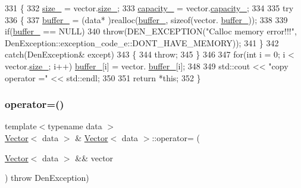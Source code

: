 \begin{DoxyCode}
331     \{
332         \hyperlink{classVector_a3c70fa478530a90177f2a7e7621ee688}{size\_} = vector.\hyperlink{classVector_a3c70fa478530a90177f2a7e7621ee688}{size\_};
333         \hyperlink{classVector_ad75911bb39018821f0e2911b6905b7ec}{capacity\_} = vector.\hyperlink{classVector_ad75911bb39018821f0e2911b6905b7ec}{capacity\_};
334 
335         \textcolor{keywordflow}{try}
336             \{
337                 \hyperlink{classVector_a22db58ae9e92c6014e8ac657804a035a}{buffer\_} = (data* )realloc(\hyperlink{classVector_a22db58ae9e92c6014e8ac657804a035a}{buffer\_}, \textcolor{keyword}{sizeof}(vector.
      \hyperlink{classVector_a22db58ae9e92c6014e8ac657804a035a}{buffer\_}));
338 
339                 \textcolor{keywordflow}{if}(\hyperlink{classVector_a22db58ae9e92c6014e8ac657804a035a}{buffer\_} == NULL)
340                     \textcolor{keywordflow}{throw}(DEN\_EXCEPTION(\textcolor{stringliteral}{"Calloc memory error!!!"}, 
      DenException::exception\_code\_e::DONT\_HAVE\_MEMORY));
341             \}
342         \textcolor{keywordflow}{catch}(DenException& except)
343             \{
344                 \textcolor{keywordflow}{throw};
345             \}
346 
347         \textcolor{keywordflow}{for}(\textcolor{keywordtype}{int} i = 0; i < vector.\hyperlink{classVector_a3c70fa478530a90177f2a7e7621ee688}{size\_}; i++) \hyperlink{classVector_a22db58ae9e92c6014e8ac657804a035a}{buffer\_}[i] = vector.
      \hyperlink{classVector_a22db58ae9e92c6014e8ac657804a035a}{buffer\_}[i];
348 
349         std::cout << \textcolor{stringliteral}{"copy operator ="} << std::endl;
350 
351         \textcolor{keywordflow}{return} *\textcolor{keyword}{this};
352     \}
\end{DoxyCode}
\mbox{\label{classVector_a68301f908c4a063eb44487500480d314}} 
\subsubsection{\texorpdfstring{operator=()}{operator=()}\hspace{0.1cm}{\footnotesize\ttfamily [2/2]}}
{\footnotesize\ttfamily template$<$typename data $>$ \\
\hyperlink{classVector}{Vector}$<$ data $>$ \& \hyperlink{classVector}{Vector}$<$ data $>$\+::operator= (\begin{DoxyParamCaption}\item[{\hyperlink{classVector}{Vector}$<$ data $>$ \&\&}]{vector }\end{DoxyParamCaption}) throw  Den\+Exception) }



